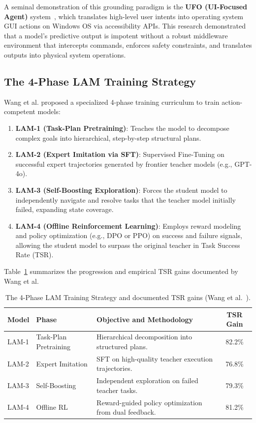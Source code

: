 \documentclass[12pt,a4paper]{report}
\begin{document}
A seminal demonstration of this grounding paradigm is the \textbf{UFO (UI-Focused Agent)} system~\cite{wang2024large}, which translates high-level user intents into operating system GUI actions on Windows OS via accessibility APIs. This research demonstrated that a model's predictive output is impotent without a robust middleware environment that intercepts commands, enforces safety constraints, and translates outputs into physical system operations.

\subsection{The 4-Phase LAM Training Strategy}
Wang et al. proposed a specialized 4-phase training curriculum to train action-competent models:
\begin{enumerate}
    \item \textbf{LAM-1 (Task-Plan Pretraining)}: Teaches the model to decompose complex goals into hierarchical, step-by-step structural plans.
    \item \textbf{LAM-2 (Expert Imitation via SFT)}: Supervised Fine-Tuning on successful expert trajectories generated by frontier teacher models (e.g., GPT-4o).
    \item \textbf{LAM-3 (Self-Boosting Exploration)}: Forces the student model to independently navigate and resolve tasks that the teacher model initially failed, expanding state coverage.
    \item \textbf{LAM-4 (Offline Reinforcement Learning)}: Employs reward modeling and policy optimization (e.g., DPO or PPO) on success and failure signals, allowing the student model to surpass the original teacher in Task Success Rate (TSR).
\end{enumerate}

Table~\ref{tab:lam_training_strategy} summarizes the progression and empirical TSR gains documented by Wang et al.

\begin{table}[htbp]
\centering
\caption{The 4-Phase LAM Training Strategy and documented TSR gains (Wang et al.~\cite{wang2024large}).}
\label{tab:lam_training_strategy}
\begin{tabular}{l l p{8.5cm} c}
\toprule
\textbf{Model} & \textbf{Phase} & \textbf{Objective and Methodology} & \textbf{TSR Gain} \\
\midrule
LAM-1 & Task-Plan Pretraining & Hierarchical decomposition into structured plans. & 82.2\% \\
LAM-2 & Expert Imitation & SFT on high-quality teacher execution trajectories. & 76.8\% \\
LAM-3 & Self-Boosting & Independent exploration on failed teacher tasks. & 79.3\% \\
LAM-4 & Offline RL & Reward-guided policy optimization from dual feedback. & 81.2\% \\
\bottomrule
\end{tabular}
\end{table}
\end{document}
